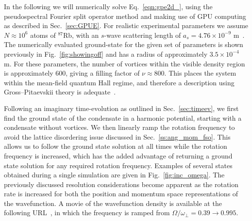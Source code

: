 In the following we will numerically solve Eq.~\eqref{eqn:gpe2d_}, using the pseudospectral Fourier split operator method and making use of GPU computing as described in Sec.~\ref{sec:GPUE}. For realistic experimental parameters we assume  $N\approx 10^6$ atoms of $^{87}$Rb, with an $s$-wave scattering length of $a_s=4.76\times10^{-9}$ m~\cite{AO:Roberts_prl_1998}. The numerically evaluated ground-state for the given set of parameters is shown previously in Fig.~\ref{fig:showingoff} and has a radius of approximately $3.5\times 10^{-4}$ m. For these parameters, the number of vortices within the visible density region is approximately 600, giving a filling factor of $\nu \approx 800 $. This places the system within the mean-field quantum Hall regime, and therefore a description using Gross--Pitaevskii theory is adequate~\cite{Vtx:Schweikhard_prl_2004}.

Following an imaginary time-evolution as outlined in Sec.~\ref{sec:timeev}, we first find the ground state of the condensate in a harmonic potential, starting with a condensate without vortices. We then linearly ramp the rotation frequency to avoid the lattice disordering issue discussed in Sec.~\ref{ss:ang_mom_fso}. This allows us to follow the ground state solution at all times while the rotation frequency is increased, which has the added advantage of returning a ground state solution for any required rotation frequency. Examples of several states obtained during a single simulation are given in Fig.~\ref{fig:inc_omega}. The previously discussed resolution considerations become apparent as the rotation rate is increased for both the position and momentum space representations of the wavefunction. A movie of the wavefunction density is available at the following URL~\cite{YT:BEC_gen}, in which the frequency is ramped from $\Omega/\omega_\perp = 0.39 \to 0.995$.


